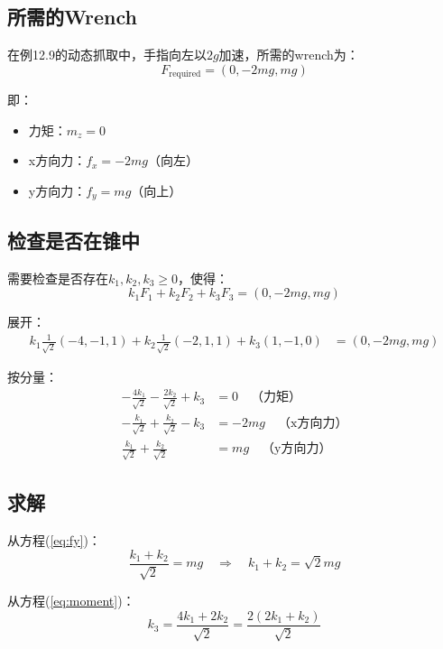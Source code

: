 \documentclass[12pt,a4paper]{article}
\begin{document}
\subsection{所需的Wrench}

在例12.9的动态抓取中，手指向左以$2g$加速，所需的wrench为：
\begin{equation}
F_{\text{required}} = (0, -2mg, mg)
\end{equation}

即：
\begin{itemize}
    \item 力矩：$m_z = 0$
    \item x方向力：$f_x = -2mg$（向左）
    \item y方向力：$f_y = mg$（向上）
\end{itemize}

\subsection{检查是否在锥中}

需要检查是否存在$k_1, k_2, k_3 \geq 0$，使得：
\begin{equation}
k_1 F_1 + k_2 F_2 + k_3 F_3 = (0, -2mg, mg)
\end{equation}

展开：
\begin{align}
k_1 \frac{1}{\sqrt{2}}(-4, -1, 1) + k_2 \frac{1}{\sqrt{2}}(-2, 1, 1) + k_3 (1, -1, 0) &= (0, -2mg, mg)
\end{align}

按分量：
\begin{align}
-\frac{4k_1}{\sqrt{2}} - \frac{2k_2}{\sqrt{2}} + k_3 &= 0 \quad \text{（力矩）} \label{eq:moment} \\
-\frac{k_1}{\sqrt{2}} + \frac{k_2}{\sqrt{2}} - k_3 &= -2mg \quad \text{（x方向力）} \label{eq:fx} \\
\frac{k_1}{\sqrt{2}} + \frac{k_2}{\sqrt{2}} &= mg \quad \text{（y方向力）} \label{eq:fy}
\end{align}

\subsection{求解}

从方程(\ref{eq:fy})：
\begin{equation}
\frac{k_1 + k_2}{\sqrt{2}} = mg \quad \Rightarrow \quad k_1 + k_2 = \sqrt{2}mg
\end{equation}

从方程(\ref{eq:moment})：
\begin{equation}
k_3 = \frac{4k_1 + 2k_2}{\sqrt{2}} = \frac{2(2k_1 + k_2)}{\sqrt{2}}
\end{equation}
\end{document}
